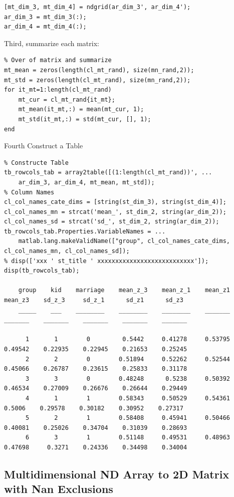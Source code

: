\documentclass[
]{book}
\begin{document}
\begin{verbatim}
[mt_dim_3, mt_dim_4] = ndgrid(ar_dim_3', ar_dim_4');
ar_dim_3 = mt_dim_3(:);
ar_dim_4 = mt_dim_4(:);
\end{verbatim}

Third, summarize each matrix:

\begin{verbatim}
% Over of matrix and summarize
mt_mean = zeros(length(cl_mt_rand), size(mn_rand,2));
mt_std = zeros(length(cl_mt_rand), size(mn_rand,2));
for it_mt=1:length(cl_mt_rand)
    mt_cur = cl_mt_rand{it_mt};
    mt_mean(it_mt,:) = mean(mt_cur, 1);
    mt_std(it_mt,:) = std(mt_cur, [], 1);
end
\end{verbatim}

Fourth Construct a Table

\begin{verbatim}
% Constructe Table
tb_rowcols_tab = array2table([(1:length(cl_mt_rand))', ...
    ar_dim_3, ar_dim_4, mt_mean, mt_std]);
% Column Names
cl_col_names_cate_dims = [string(st_dim_3), string(st_dim_4)];
cl_col_names_mn = strcat('mean_', st_dim_2, string(ar_dim_2));
cl_col_names_sd = strcat('sd_', st_dim_2, string(ar_dim_2));
tb_rowcols_tab.Properties.VariableNames = ...
    matlab.lang.makeValidName(["group", cl_col_names_cate_dims, cl_col_names_mn, cl_col_names_sd]);
% disp(['xxx ' st_title ' xxxxxxxxxxxxxxxxxxxxxxxxxxx']);
disp(tb_rowcols_tab);

    group    kid    marriage    mean_z_3    mean_z_1    mean_z1    mean_z3    sd_z_3     sd_z_1      sd_z1      sd_z3 
    _____    ___    ________    ________    ________    _______    _______    _______    _______    _______    _______

      1       1        0         0.5442     0.41278     0.53795    0.49542    0.22935    0.22945    0.21653    0.25245
      2       2        0        0.51894     0.52262     0.52544    0.45066    0.26787    0.23615    0.25833    0.31178
      3       3        0        0.48248      0.5238     0.50392    0.46534    0.27009    0.26676    0.26644    0.29449
      4       1        1        0.58343     0.50529     0.54361     0.5006    0.29578    0.30182    0.30952    0.27317
      5       2        1        0.58408     0.45941     0.50466    0.40081    0.25026    0.34704    0.31039    0.28693
      6       3        1        0.51148     0.49531     0.48963    0.47698     0.3271    0.24336    0.34498    0.34004
\end{verbatim}

\hypertarget{multidimensional-nd-array-to-2d-matrix-with-nan-exclusions}{%
\subsection{Multidimensional ND Array to 2D Matrix with Nan Exclusions}\label{multidimensional-nd-array-to-2d-matrix-with-nan-exclusions}}
\end{document}
